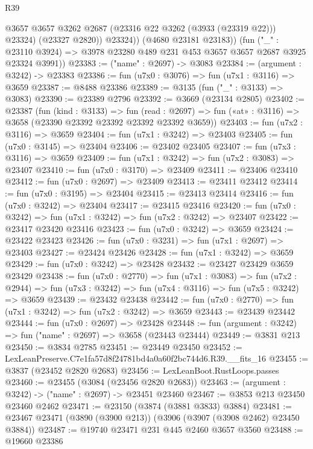 \begin{lexlean}{R39}
\begin{coremodule}
                @3657
                @3657
                @3262
                @2687
                (@23316 @22 @3262 (@3933 (@23319 @22)))
                @23324)
              (@23327 @2820))
            @23324))
        (@4680 @23181 @23183))
      (fun ("_" : @23110 @3924) =>
      @3978 @23280 @489 @231 @453 @3657 @3657 @2687 @3925 @23324 @3991))
@23383 := ("name" : @2697) -> @3083
@23384 := (argument : @3242) -> @23383
@23386 := fun (u7x0 : @3076) => fun (u7x1 : @3116) => @3659
@23387 := @8488 @23386
@23389 := @3135 (fun ("_" : @3133) => @3083)
@23390 := @23389 @2796
@23392 := @3669 (@23134 @2805)
@23402 := @23387
    (fun (kind : @3133) =>
    fun (read : @2697) => fun («at» : @3116) => @3658 (@23390 @23392 @23392 @23392 @23392 @3659))
@23403 := fun (u7x2 : @3116) => @3659
@23404 := fun (u7x1 : @3242) => @23403
@23405 := fun (u7x0 : @3145) => @23404
@23406 := @23402 @23405
@23407 := fun (u7x3 : @3116) => @3659
@23409 := fun (u7x1 : @3242) => fun (u7x2 : @3083) => @23407
@23410 := fun (u7x0 : @3170) => @23409
@23411 := @23406 @23410
@23412 := fun (u7x0 : @2697) => @23409
@23413 := @23411 @23412
@23414 := fun (u7x0 : @3195) => @23404
@23415 := @23413 @23414
@23416 := fun (u7x0 : @3242) => @23404
@23417 := @23415 @23416
@23420 := fun (u7x0 : @3242) => fun (u7x1 : @3242) => fun (u7x2 : @3242) => @23407
@23422 := @23417 @23420 @23416
@23423 := fun (u7x0 : @3242) => @3659
@23424 := @23422 @23423
@23426 := fun (u7x0 : @3231) => fun (u7x1 : @2697) => @23403
@23427 := @23424 @23426
@23428 := fun (u7x1 : @3242) => @3659
@23429 := fun (u7x0 : @3242) => @23428
@23432 := @23427 @23429 @3659 @23429
@23438 := fun (u7x0 : @2770) =>
  fun (u7x1 : @3083) =>
  fun (u7x2 : @2944) => fun (u7x3 : @3242) => fun (u7x4 : @3116) => fun (u7x5 : @3242) => @3659
@23439 := @23432 @23438
@23442 := fun (u7x0 : @2770) => fun (u7x1 : @3242) => fun (u7x2 : @3242) => @3659
@23443 := @23439 @23442
@23444 := fun (u7x0 : @2697) => @23428
@23448 := fun (argument : @3242) => fun ("name" : @2697) => @3658 (@23443 @23444)
@23449 := @3831 @213
@23450 := @3834 @2785
@23451 := @23449 @23450
@23452 := LexLeanPreserve.C7e1fa57d8f24781bd4a0a60f2bc744d6.R39.__fits_16
@23455 := @3837 (@23452 @2820 @2683)
@23456 := LexLeanBoot.RustLoops.passes
@23460 := @23455 (@3084 (@23456 @2820 @2683))
@23463 := (argument : @3242) -> ("name" : @2697) -> @23451 @23460
@23467 := @3853 @213 @23450 @23460 @2462
@23471 := @23150 (@3874 (@3881 @3833) @3884)
@23481 := @23467 @23471 (@3890 (@3900 @213)) (@3906 (@3907 (@3908 @2462) @23450 @3884))
@23487 := @19740 @23471 @231 @445 @2460 @3657 @3560
@23488 := @19660 @23386

\end{coremodule}
\end{lexlean}
